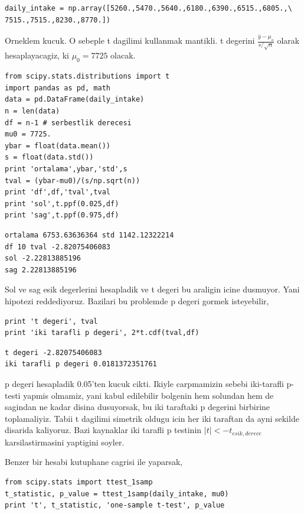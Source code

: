 \documentclass[12pt,fleqn]{article}\usepackage{../common}
\begin{document}
\begin{verbatim}
daily_intake = np.array([5260.,5470.,5640.,6180.,6390.,6515.,6805.,\
7515.,7515.,8230.,8770.])
\end{verbatim}

Orneklem kucuk. O sebeple t dagilimi kullanmak mantikli. t degerini
$\frac{\bar{y}-\mu_o}{s/\sqrt{n}}$ olarak hesaplayacagiz, ki $\mu_0=7725$ olacak.

\begin{verbatim}
from scipy.stats.distributions import t
import pandas as pd, math
data = pd.DataFrame(daily_intake)
n = len(data)
df = n-1 # serbestlik derecesi
mu0 = 7725.
ybar = float(data.mean())
s = float(data.std())
print 'ortalama',ybar,'std',s
tval = (ybar-mu0)/(s/np.sqrt(n))
print 'df',df,'tval',tval
print 'sol',t.ppf(0.025,df)
print 'sag',t.ppf(0.975,df)
\end{verbatim}

\begin{verbatim}
ortalama 6753.63636364 std 1142.12322214
df 10 tval -2.82075406083
sol -2.22813885196
sag 2.22813885196
\end{verbatim}

Sol ve sag esik degerlerini hesapladik ve t degeri bu araligin icine
dusmuyor. Yani hipotezi reddediyoruz. Bazilari bu problemde p degeri gormek
isteyebilir, 

\begin{verbatim}
print 't degeri', tval
print 'iki tarafli p degeri', 2*t.cdf(tval,df)
\end{verbatim}

\begin{verbatim}
t degeri -2.82075406083
iki tarafli p degeri 0.0181372351761
\end{verbatim}

p degeri hesapladik 0.05'ten kucuk cikti. Ikiyle carpmamizin sebebi
iki-tarafli p-testi yapmis olmamiz, yani kabul edilebilir bolgenin hem
solundan hem de sagindan ne kadar disina dusuyorsak, bu iki taraftaki p
degerini birbirine toplamaliyiz. Tabii t dagilimi simetrik oldugu icin her
iki taraftan da ayni sekilde disarida kaliyoruz. Bazi kaynaklar iki tarafli
p testinin $|t| < -t_{esik,derece}$ karsilastirmasini yaptigini soyler.

Benzer bir hesabi kutuphane cagrisi ile yaparsak,

\begin{verbatim}
from scipy.stats import ttest_1samp
t_statistic, p_value = ttest_1samp(daily_intake, mu0)
print 't', t_statistic, 'one-sample t-test', p_value
\end{verbatim}
\end{document}
